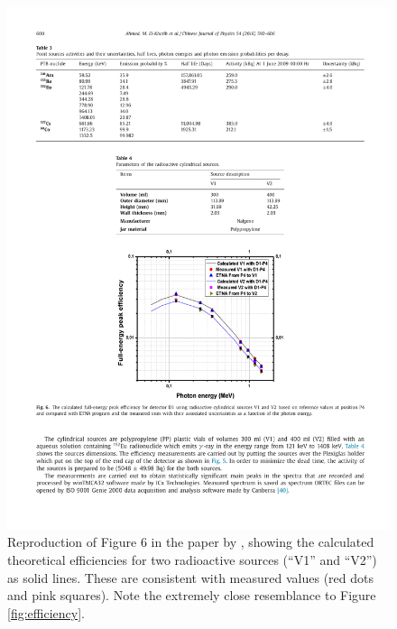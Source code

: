 \documentclass[twocol]{ametsocV6.1}
\begin{document}
\begin{figure}[ht]
	\centering
	\includegraphics[width=\linewidth]{../figures/theoretical_fepe.pdf}
	\cprotect\caption{%
		Reproduction of Figure 6 in the paper by \cite{theoretical_fepe},
		showing
		the calculated theoretical efficiencies for two radioactive sources
		(``V1'' and ``V2'') as solid lines. These are consistent with
		measured values (red dots and pink squares). Note the extremely close
		resemblance to Figure \ref{fig:efficiency}.
	}
	\label{theoretical_fepe}
\end{figure}
\end{document}
